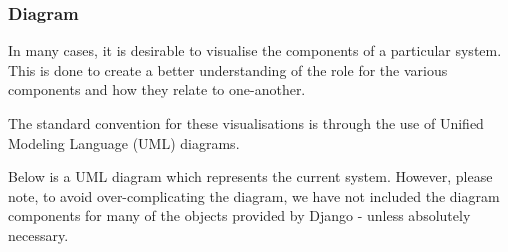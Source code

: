	\subsubsection{Diagram}
		In many cases, it is desirable to visualise the components of a particular system. This is done to create a better understanding of the role for the various components and how they relate to one-another.
		
		The standard convention for these visualisations is through the use of  Unified Modeling Language (UML) diagrams.
		
		Below is a UML diagram which represents the current system. However, please note, to avoid over-complicating the diagram, we have not included the diagram components for many of the objects provided by Django - unless absolutely necessary.